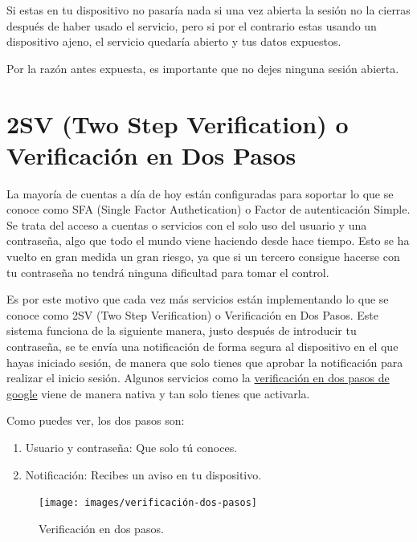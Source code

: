 \documentclass[
  spanish,
  a4paper,
  openany]{book}
\providecommand{\tightlist}{%
  \setlength{\itemsep}{0pt}\setlength{\parskip}{0pt}}
\begin{document}
Si estas en tu dispositivo no pasaría nada si una vez abierta la sesión no la cierras después de haber usado el servicio, pero si por el contrario estas usando un dispositivo ajeno, el servicio quedaría abierto y tus datos expuestos.

Por la razón antes expuesta, es importante que no dejes ninguna sesión abierta.

\hypertarget{sv-two-step-verification-o-verificaciuxf3n-en-dos-pasos}{%
\section{2SV (Two Step Verification) o Verificación en Dos Pasos}\label{sv-two-step-verification-o-verificaciuxf3n-en-dos-pasos}}

La mayoría de cuentas a día de hoy están configuradas para soportar lo que se conoce como SFA (Single Factor Authetication) o Factor de autenticación Simple. Se trata del acceso a cuentas o servicios con el solo uso del usuario y una contraseña, algo que todo el mundo viene haciendo desde hace tiempo. Esto se ha vuelto en gran medida un gran riesgo, ya que si un tercero consigue hacerse con tu contraseña no tendrá ninguna dificultad para tomar el control.

Es por este motivo que cada vez más servicios están implementando lo que se conoce como 2SV (Two Step Verification) o Verificación en Dos Pasos. Este sistema funciona de la siguiente manera, justo después de introducir tu contraseña, se te envía una notificación de forma segura al dispositivo en el que hayas iniciado sesión, de manera que solo tienes que aprobar la notificación para realizar el inicio sesión. Algunos servicios como la \href{https://support.google.com/accounts/answer/185839?co=GENIE.Platform\%3DDesktop\&hl=es}{verificación en dos pasos de google} viene de manera nativa y tan solo tienes que activarla.

Como puedes ver, los dos pasos son:

\begin{enumerate}
\def\labelenumi{\arabic{enumi}.}
\tightlist
\item
  Usuario y contraseña: Que solo tú conoces.
\item
  Notificación: Recibes un aviso en tu dispositivo.
\end{enumerate}

\begin{figure}

{\centering \texttt{[image: images/verificación-dos-pasos]} 

}

\caption{Verificación en dos pasos.}\label{fig:unnamed-chunk-13}
\end{figure}
\end{document}
